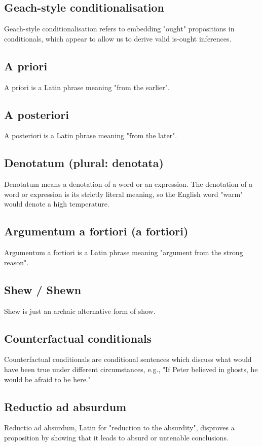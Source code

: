 \documentclass[11pt]{article}
\begin{document}
\subsection{Geach-style conditionalisation}
\label{sec:orgb3875c3}
Geach-style conditionalisation refers to embedding "ought" propositions in conditionals, which appear to allow us to derive valid is-ought inferences.
\subsection{A priori}
\label{sec:org1f6cf30}
A priori is a Latin phrase meaning "from the earlier".
\subsection{A posteriori}
\label{sec:orgecf3536}
A posteriori is a Latin phrase meaning "from the later".
\subsection{Denotatum (plural: denotata)}
\label{sec:org7e96a87}
Denotatum means a denotation of a word or an expression. The denotation of a word or expression is its strictly literal meaning, so the English word "warm" would denote a high temperature.
\subsection{Argumentum a fortiori (a fortiori)}
\label{sec:orge0195ae}
Argumentum a fortiori is a Latin phrase meaning "argument from the strong reason".
\subsection{Shew / Shewn}
\label{sec:org8bdd3bc}
Shew is just an archaic alternative form of show.
\subsection{Counterfactual conditionals}
\label{sec:orgf687931}
Counterfactual conditionals are conditional sentences which discuss what would have been true under different circumstances, e.g., "If Peter believed in ghosts, he would be afraid to be here."
\subsection{Reductio ad absurdum}
\label{sec:org9979a66}
Reductio ad absurdum, Latin for "reduction to the absurdity", disproves a proposition by showing that it leads to absurd or untenable conclusions.
\end{document}
